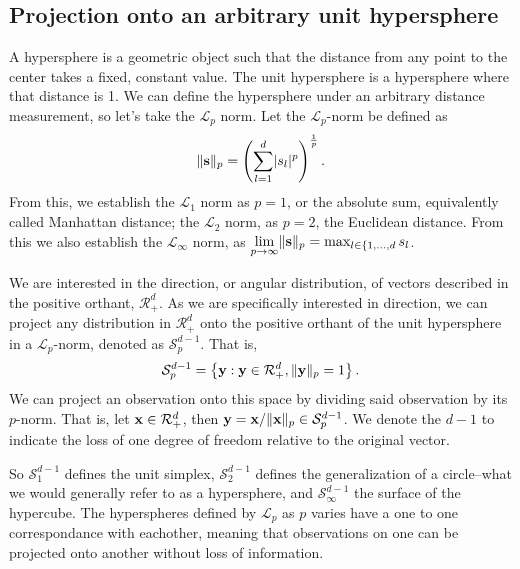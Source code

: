 \subsection{Projection onto an arbitrary unit hypersphere}
A hypersphere is a geometric object such that the distance from any point to the center takes a fixed,
  constant value.  The unit hypersphere is a hypersphere where that distance is 1. We can define the
  hypersphere under an arbitrary distance measurement, so let's take the $\mathcal{L}_p$ norm. Let
  the $\mathcal{L}_p$-norm be defined as
  \begin{equation*}
    \lVert {\bf s} \rVert_p = \left(\sum_{l = 1}^d \lvert s_l\rvert^p\right)^{\frac{1}{p}}.
  \end{equation*}
  From this, we establish the $\mathcal{L}_1$ norm as $p = 1$, or the absolute sum, equivalently called
  Manhattan distance; the $\mathcal{L}_2$ norm, as $p = 2$, the Euclidean distance.  From this we
  also establish the $\mathcal{L}_{\infty}$ norm, as
  $\lim\limits_{p\to\infty} \lVert {\bf s} \rVert_p = \max_{l\in\lbrace{1,\ldots,d}}s_l$.

We are interested in the direction, or angular distribution, of vectors described in the positive
  orthant, $\mathcal{R}_{+}^d$.  As we are specifically interested in direction, we can project any
  distribution in $\mathcal{R}_{+}^d$ onto the positive orthant of the unit hypersphere in a
  $\mathcal{L}_p$-norm, denoted as $\mathcal{S}_{p}^{d-1}$.  That is,
  \begin{equation*}
    \mathcal{S}_{p}^{d-1} = \left\lbrace {\bf y} : {\bf y} \in \mathcal{R}_{+}^{d}, \lVert {\bf y}\rVert_{p} = 1\right\rbrace.
  \end{equation*}
  We can project an observation onto this space by dividing said observation by its $p$-norm.  That
  is, let ${\bf x}\in \mathcal{R}_{+}^{d}$, then
  ${\bf y} = {\bf x} / \lVert {\bf x}\rVert_p \in \mathcal{S}_{p}^{d-1}$.  We denote the $d-1$
  to indicate the loss of one degree of freedom relative to the original vector.

So $\mathcal{S}_{1}^{d-1}$ defines the unit simplex, $\mathcal{S}_{2}^{d-1}$ defines the generalization of a
  circle--what we would generally refer to as a hypersphere, and $\mathcal{S}_{\infty}^{d-1}$ the surface of
  the hypercube. The hyperspheres defined by $\mathcal{L}_p$ as $p$ varies have a one to one correspondance
  with eachother, meaning that observations on one can be projected onto another without loss of
  information.

